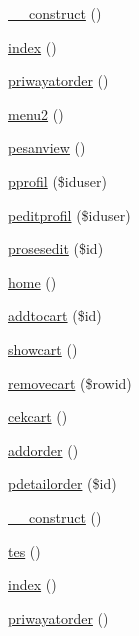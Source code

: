 \begin{DoxyCompactItemize}
\item 
\mbox{\hyperlink{class_pelanggan_a095c5d389db211932136b53f25f39685}{\+\_\+\+\_\+construct}} ()
\item 
\mbox{\hyperlink{class_pelanggan_a149eb92716c1084a935e04a8d95f7347}{index}} ()
\item 
\mbox{\hyperlink{class_pelanggan_a64d2e90b64610aecd5143e436b3a1c00}{priwayatorder}} ()
\item 
\mbox{\hyperlink{class_pelanggan_ad2c26cff98a5f9db6b4dec1edc8ada7b}{menu2}} ()
\item 
\mbox{\hyperlink{class_pelanggan_a2184e0cd904ece2a3390ff342aedfeef}{pesanview}} ()
\item 
\mbox{\hyperlink{class_pelanggan_a656de37894005c0bcc616041b8e57648}{pprofil}} (\$iduser)
\item 
\mbox{\hyperlink{class_pelanggan_a321df46e6899c5ecef512bee948efa2f}{peditprofil}} (\$iduser)
\item 
\mbox{\hyperlink{class_pelanggan_a580c41d234a611e73e56a65f5c5f3e48}{prosesedit}} (\$id)
\item 
\mbox{\hyperlink{class_pelanggan_a174b8e4c7d4d7363c6f773671defdeff}{home}} ()
\item 
\mbox{\hyperlink{class_pelanggan_ae739aac7ade34944585151952e9c523a}{addtocart}} (\$id)
\item 
\mbox{\hyperlink{class_pelanggan_a31e5e82d730a882fc93614c8e0878d2b}{showcart}} ()
\item 
\mbox{\hyperlink{class_pelanggan_a1b9dd472c16e5d04be01be8032bd7ffa}{removecart}} (\$rowid)
\item 
\mbox{\hyperlink{class_pelanggan_a4fe1079bf267b3b43db2d67e1c437e25}{cekcart}} ()
\item 
\mbox{\hyperlink{class_pelanggan_a375fb206d13bec0bc37f55b825bcbebf}{addorder}} ()
\item 
\mbox{\hyperlink{class_pelanggan_abf13866356efd4ebc95ca03b7429520f}{pdetailorder}} (\$id)
\item 
\mbox{\hyperlink{class_pelanggan_a095c5d389db211932136b53f25f39685}{\+\_\+\+\_\+construct}} ()
\item 
\mbox{\hyperlink{class_pelanggan_a7f3c2d562afcfc1c3e52bda7637191cf}{tes}} ()
\item 
\mbox{\hyperlink{class_pelanggan_a149eb92716c1084a935e04a8d95f7347}{index}} ()
\item 
\mbox{\hyperlink{class_pelanggan_a64d2e90b64610aecd5143e436b3a1c00}{priwayatorder}} ()
\item 

\end{DoxyCompactItemize}
